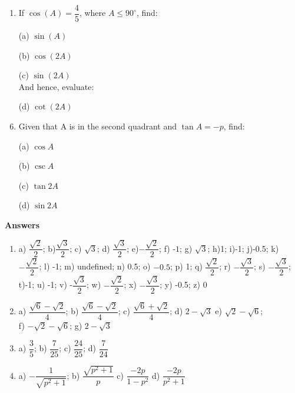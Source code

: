 \documentclass[14pt]{extarticle}
\begin{document}
\begin{flushleft}
\begin{enumerate}
\vspace{0.3 in}

\item If $\cos(A) = \dfrac{4}{5}$, where $A\le 90^\circ$, find: 
    \item[(a)] $\sin(A)$
    \item[(b)] $\cos(2A)$
    \item[(c)] $\sin(2A)$\\ 
    \vspace{0.15 in}
And hence, evaluate: 
    \item[(d)] $\cot(2A)$

\clearpage

\item Given that A is in the second quadrant and $\tan A = -p$, find: 
    \item [(a)] $\cos A$
    \item [(b)] $\csc A$
    \item [(c)] $\tan 2A$
    \item [(d)] $\sin 2A$

\newpage
\mbox{}
\newpage

\newpage
\mbox{}
\newpage

\newpage
\mbox{}
\newpage

\newpage
\mbox{}
\newpage
    


\end{enumerate}

\clearpage
\textbf{Answers}
\begin{enumerate}
    \item a) $\dfrac{\sqrt{2}}{2}$; b)$\dfrac{\sqrt{3}}{2}$; c) $\sqrt{3}$; d) $\dfrac{\sqrt{3}}{2}$; e)$-\dfrac{\sqrt{2}}{2}$; f) -$1$; g) $\sqrt{3}$; h)1; i)-1; j)-0.5; k) $-\dfrac{\sqrt{2}}{2}$; l) -1; m) undefined; n) 0.5; o) $-0.5$; p) 1; q) $\dfrac{\sqrt{2}}{2}$; r) $-\dfrac{\sqrt{3}}{2}$; s) $-\dfrac{\sqrt{3}}{2}$; t)-1;
    u) -1; v) -$\dfrac{\sqrt{3}}{2}$; w) $-\dfrac{\sqrt{2}}{2}$; x) $-\dfrac{\sqrt{3}}{2}$; y) -0.5; z) 0
    \vspace{0.2 in}
    \item a) $\dfrac{\sqrt{6}-\sqrt{2}}{4}$; b) $\dfrac{\sqrt{6}-\sqrt{2}}{4}$; c) $\dfrac{\sqrt{6}+\sqrt{2}}{4}$; d) $2-\sqrt{3}$ e) $\sqrt{2} - \sqrt{6}$; \\
    \vspace{0.1 in}
    f) $-\sqrt{2} - \sqrt{6}$; g) $2 - \sqrt{3}$
    \vspace{0.1 in}
    \item a) $\dfrac{3}{5}$; b) $\dfrac{7}{25}$; c) $\dfrac{24}{25}$; d) $\dfrac{7}{24}$
    \vspace{0.1 in}
    \item a) $-\dfrac{1}{\sqrt{p^2+1}}$; b) $\dfrac{\sqrt{p^2 +1}}{p}$
    c) $\dfrac{-2p}{1-p^2}$
    d) $\dfrac{-2p}{p^2+1}$
\end{enumerate}


\end{flushleft}
\end{document}
